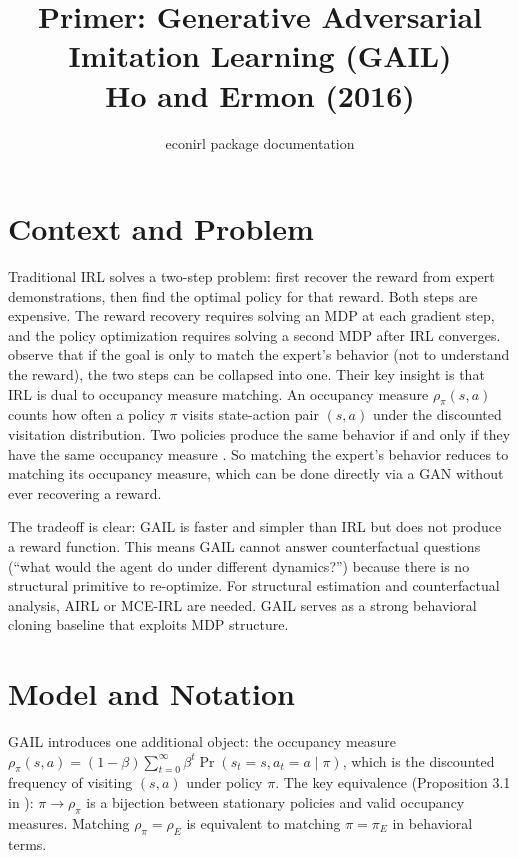 \documentclass[11pt]{article}
\title{Primer: Generative Adversarial Imitation Learning (GAIL)\\[3pt]
\large Ho and Ermon (2016)}
\author{econirl package documentation}
\date{}
\begin{document}
\maketitle
\vspace{-0.5em}

\section{Context and Problem}

Traditional IRL solves a two-step problem: first recover the reward from expert demonstrations, then find the optimal policy for that reward.
Both steps are expensive.
The reward recovery requires solving an MDP at each gradient step, and the policy optimization requires solving a second MDP after IRL converges.
\citet{hoErmon2016} observe that if the goal is only to match the expert's behavior (not to understand the reward), the two steps can be collapsed into one.
Their key insight is that IRL is dual to occupancy measure matching.
An occupancy measure $\rho_\pi(s,a)$ counts how often a policy $\pi$ visits state-action pair $(s,a)$ under the discounted visitation distribution.
Two policies produce the same behavior if and only if they have the same occupancy measure \citep{puterman1994}.
So matching the expert's behavior reduces to matching its occupancy measure, which can be done directly via a GAN \citep{goodfellow2014} without ever recovering a reward.

The tradeoff is clear: GAIL is faster and simpler than IRL but does not produce a reward function.
This means GAIL cannot answer counterfactual questions (``what would the agent do under different dynamics?'') because there is no structural primitive to re-optimize.
For structural estimation and counterfactual analysis, AIRL \citep{fu2018} or MCE-IRL \citep{ziebart2010} are needed.
GAIL serves as a strong behavioral cloning baseline that exploits MDP structure.

\section{Model and Notation}

\commonnotation

GAIL introduces one additional object: the occupancy measure $\rho_\pi(s,a) = (1-\beta) \sum_{t=0}^\infty \beta^t \Pr(s_t = s, a_t = a \mid \pi)$, which is the discounted frequency of visiting $(s,a)$ under policy $\pi$.
The key equivalence (Proposition 3.1 in \citealt{hoErmon2016}): $\pi \to \rho_\pi$ is a bijection between stationary policies and valid occupancy measures.
Matching $\rho_\pi = \rho_E$ is equivalent to matching $\pi = \pi_E$ in behavioral terms.
\end{document}
